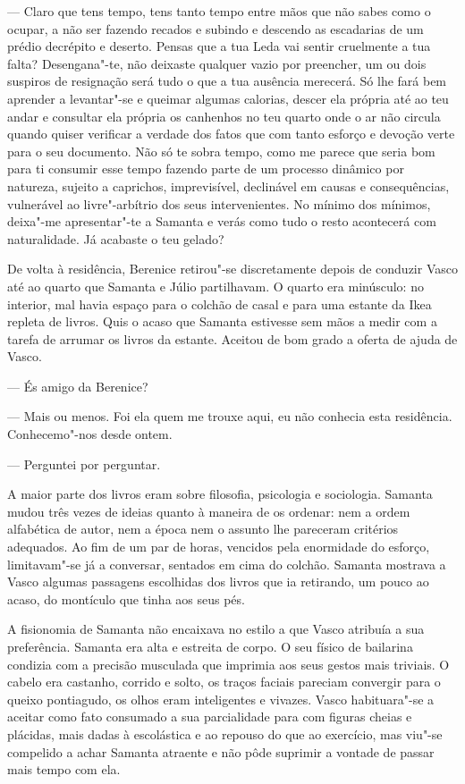 --- Claro que tens tempo, tens tanto tempo entre mãos que não sabes como o
  ocupar, a não ser fazendo recados e subindo e descendo as escadarias
  de um prédio decrépito e deserto. Pensas que a tua Leda vai sentir
  cruelmente a tua falta? Desengana"-te, não deixaste qualquer vazio por
  preencher, um ou dois suspiros de resignação será tudo o que a tua
  ausência merecerá. Só lhe fará bem aprender a levantar"-se e queimar
  algumas calorias, descer ela própria até ao teu andar e consultar
  ela própria os canhenhos no teu quarto onde o ar não circula quando
  quiser verificar a verdade dos fatos que com tanto esforço e devoção
  verte para o seu documento. Não só te sobra tempo, como me parece que
  seria bom para ti consumir esse tempo fazendo parte de um processo
  dinâmico por natureza, sujeito a caprichos, imprevisível, declinável
  em causas e consequências, vulnerável ao livre"-arbítrio dos seus
  intervenientes. No mínimo dos mínimos, deixa"-me apresentar"-te a
  Samanta e verás como tudo o resto acontecerá com naturalidade. Já
  acabaste o teu gelado?

De volta à residência, Berenice retirou"-se discretamente depois de
conduzir Vasco até ao quarto que Samanta e Júlio partilhavam. O quarto
era minúsculo: no interior, mal havia
espaço para o colchão de casal e para uma estante da Ikea repleta de
livros. Quis o acaso que Samanta estivesse sem mãos a medir com a tarefa
de arrumar os livros da estante. Aceitou de bom grado a oferta de ajuda
de Vasco.

--- És amigo da Berenice?

--- Mais ou menos. Foi ela quem me trouxe aqui, eu não conhecia esta
  residência. Conhecemo"-nos desde ontem.

--- Perguntei por perguntar.

A maior parte dos livros eram sobre filosofia, psicologia e sociologia.
Samanta mudou três vezes de ideias quanto à maneira de os ordenar: nem
a ordem alfabética de autor, nem a época nem o assunto lhe pareceram
critérios adequados. Ao fim de um par de horas, vencidos pela enormidade
do esforço, limitavam"-se já a conversar, sentados em cima do colchão.
Samanta mostrava a Vasco algumas passagens escolhidas dos livros que ia
retirando, um pouco ao acaso, do montículo que tinha aos seus pés.

A fisionomia de Samanta não encaixava no estilo a que Vasco atribuía a
sua preferência. Samanta era alta e estreita de corpo. O seu físico de
bailarina condizia com a precisão musculada que imprimia aos seus
gestos mais triviais. O cabelo era castanho, corrido e solto, os traços
faciais pareciam convergir para o queixo pontiagudo, os olhos eram
inteligentes e vivazes. Vasco habituara"-se a aceitar como fato
consumado a sua parcialidade para com figuras cheias e plácidas, mais
dadas à escolástica e ao repouso do que ao exercício, mas viu"-se compelido a achar Samanta atraente e não pôde suprimir a vontade de
passar mais tempo com ela.


